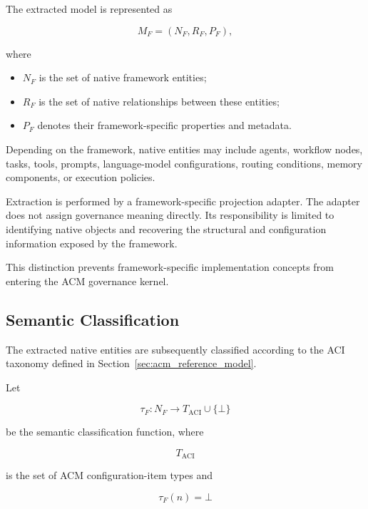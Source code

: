 \documentclass[10pt]{article}
\begin{document}
The extracted model is represented as

\begin{equation}
M_F=(N_F,R_F,P_F),
\end{equation}

where

\begin{itemize}
	\item $N_F$ is the set of native framework entities;
	\item $R_F$ is the set of native relationships between these entities;
	\item $P_F$ denotes their framework-specific properties and metadata.
\end{itemize}

Depending on the framework, native entities may include agents, workflow nodes,
tasks, tools, prompts, language-model configurations, routing conditions,
memory components, or execution policies.

Extraction is performed by a framework-specific projection adapter. The adapter
does not assign governance meaning directly. Its responsibility is limited to
identifying native objects and recovering the structural and configuration
information exposed by the framework.

This distinction prevents framework-specific implementation concepts from
entering the ACM governance kernel.

\subsection{Semantic Classification}

The extracted native entities are subsequently classified according to the ACI
taxonomy defined in Section~\ref{sec:acm_reference_model}.

Let

\begin{equation}
\tau_F :
N_F
\rightarrow
T_{\mathrm{ACI}}
\cup
\{\bot\}
\end{equation}

be the semantic classification function, where

\begin{equation}
T_{\mathrm{ACI}}
\end{equation}

is the set of ACM configuration-item types and

\begin{equation}
\tau_F(n)=\bot
\end{equation}
\end{document}

